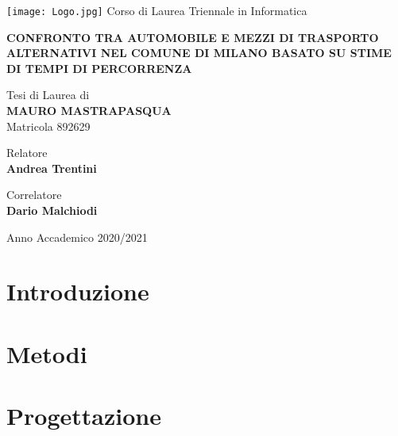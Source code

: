 \documentclass[a4paper,12pt]{report}
\newcommand\blankpage{
	\null
	\addtocounter{page}{-1}
	\thispagestyle{empty}
	\newpage
}
\newcommand\blankpagen{
	\null
	\addtocounter{page}{0}
	\newpage
}
\begin{document}
\begin{titlepage}
\begin{center}
\texttt{[image: Logo.jpg]}
\large{Corso di Laurea Triennale in Informatica}

\vspace{1.6cm}

\Large{\textbf{CONFRONTO TRA AUTOMOBILE E MEZZI DI TRASPORTO ALTERNATIVI NEL COMUNE DI MILANO BASATO SU STIME DI TEMPI DI PERCORRENZA}}

\vspace{1.4cm}

\large{Tesi di Laurea di} \\
\large{\textbf{MAURO MASTRAPASQUA}} \\
\large{Matricola 892629}
\end{center}

\begin{flushleft}
\vspace{1.6cm}

\normalsize{Relatore} \\
\normalsize{\textbf{Andrea Trentini}}

\vspace{0.4cm}

\normalsize{Correlatore} \\
\normalsize{\textbf{Dario Malchiodi}}
\end{flushleft}

\begin{center}
\vspace{1.6cm}

\large{Anno Accademico 2020/2021}
\end{center}
\end{titlepage}

\afterpage{\blankpage}

\tableofcontents

\chapter{Introduzione}


\chapter{Metodi}


\afterpage{\blankpagen}

\chapter{Progettazione}

\end{document}
